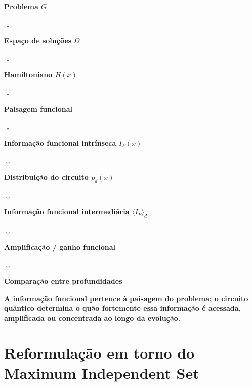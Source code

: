 \documentclass[11pt,a4paper]{article}
\begin{document}
\begin{center}

\begin{tcolorbox}[
    width=0.90\textwidth,
    colback=softgray,
    colframe=mainblue,
    boxrule=0.6pt,
    arc=2mm
]

\centering

\textbf{Problema $G$}

\vspace{0.15cm}
$\downarrow$

\textbf{Espaço de soluções $\Omega$}

\vspace{0.15cm}
$\downarrow$

\textbf{Hamiltoniano $H(x)$}

\vspace{0.15cm}
$\downarrow$

\textbf{Paisagem funcional}

\vspace{0.15cm}
$\downarrow$

\textbf{Informação funcional intrínseca $I_F(x)$}

\vspace{0.15cm}
$\downarrow$

\textbf{Distribuição do circuito $p_d(x)$}

\vspace{0.15cm}
$\downarrow$

\textbf{Informação funcional intermediária $\langle I_F\rangle_d$}

\vspace{0.15cm}
$\downarrow$

\textbf{Amplificação / ganho funcional}

\vspace{0.15cm}
$\downarrow$

\textbf{Comparação entre profundidades}

\end{tcolorbox}

\end{center}

\begin{mainidea}
\centering
\textbf{
A informação funcional pertence à paisagem do problema;
o circuito quântico determina o quão fortemente essa informação
é acessada, amplificada ou concentrada ao longo da evolução.
}
\end{mainidea}

\section{Reformulação em torno do Maximum Independent Set}
\end{document}
